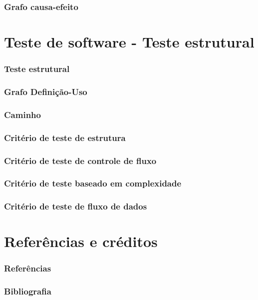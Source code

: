 \documentclass[utf8, usepdftitle=false, svgnames, color={table,
fixpdftex, hyperref, fixinclude, xcdraw}, t, brazil]{beamer}
\begin{document}
 \section{Grafo causa-efeito}
  
 
 \part{Teste de software - Teste estrutural}
 
 \section{Teste estrutural}
 
 
 \section{Grafo Definição-Uso}
 

 \section{Caminho}
 

 \section{Critério de teste de estrutura}
 
 
 \section{Critério de teste de controle de fluxo}
  
 
 \section{Critério de teste baseado em complexidade}
  

 \section{Critério de teste de fluxo de dados}
   
 
 \part{Referências e créditos}
 
 \section{Referências}
 
 
 \section{Bibliografia}
 
 
%  
\end{document}
